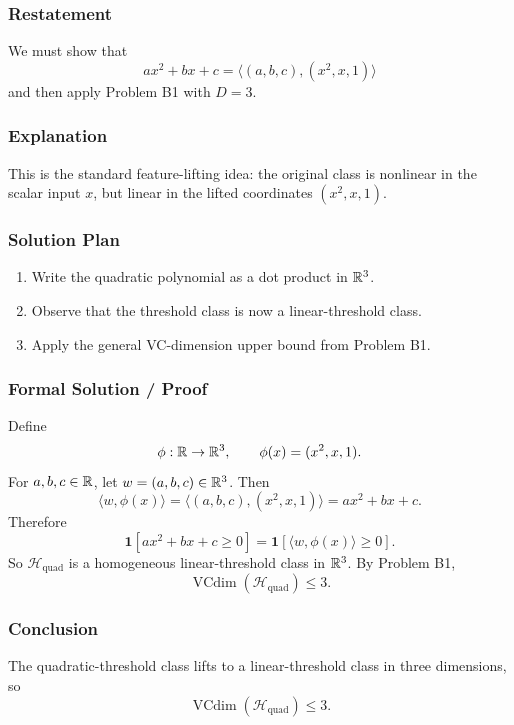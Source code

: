 \documentclass{article}
\newcommand{\vcdim}{\operatorname{VCdim}}
\newcommand{\classB}{\mathcal{H}_{\mathrm{quad}}}
\begin{document}
\begin{solutionbox}

\subsubsection{Restatement}

We must show that
\[
a x^2+b x+c
=
\langle (a,b,c),(x^2,x,1)\rangle
\]
and then apply Problem B1 with \(D=3\).

\subsubsection{Explanation}

This is the standard feature-lifting idea: the original class is nonlinear in
the scalar input \(x\), but linear in the lifted coordinates \((x^2,x,1)\).

\subsubsection{Solution Plan}

\begin{enumerate}[leftmargin=2.5em]
    \item Write the quadratic polynomial as a dot product in \(\mathbb{R}^3\).
    \item Observe that the threshold class is now a linear-threshold class.
    \item Apply the general VC-dimension upper bound from Problem B1.
\end{enumerate}

\subsubsection{Formal Solution / Proof}

Define
\[
\phi:\mathbb{R}\to\mathbb{R}^3,
\qquad
\phi(x)=(x^2,x,1).
\]
For \(a,b,c\in\mathbb{R}\), let \(w=(a,b,c)\in\mathbb{R}^3\). Then
\[
\langle w,\phi(x)\rangle
=
\langle (a,b,c),(x^2,x,1)\rangle
=
a x^2+b x+c.
\]
Therefore
\[
\mathbf{1}[a x^2+b x+c\ge 0]
=
\mathbf{1}[\langle w,\phi(x)\rangle \ge 0].
\]
So \(\classB\) is a homogeneous linear-threshold class in \(\mathbb{R}^3\). By Problem
B1,
\[
\vcdim(\classB)\le 3.
\]

\subsubsection{Conclusion}

The quadratic-threshold class lifts to a linear-threshold class in three
dimensions, so
\[
\vcdim(\classB)\le 3.
\]


\end{solutionbox}
\end{document}
